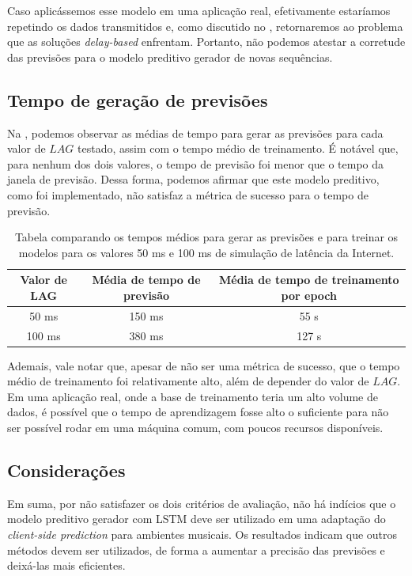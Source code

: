 Caso aplicássemos esse modelo em uma aplicação real, efetivamente estaríamos repetindo os dados transmitidos e, como discutido no , retornaremos ao problema que as soluções \textit{delay-based} enfrentam. Portanto, não podemos atestar a corretude das previsões para o modelo preditivo gerador de novas sequências.

\subsection{Tempo de geração de previsões}

Na , podemos observar as médias de tempo para gerar as previsões para cada valor de $LAG$ testado, assim com o tempo médio de treinamento. É notável que, para nenhum dos dois valores, o tempo de previsão foi menor que o tempo da janela de previsão. Dessa forma, podemos afirmar que este modelo preditivo, como foi implementado, não satisfaz a métrica de sucesso para o tempo de previsão.

\begin{table}[ht!]
    \centering
    \begin{tabular}{|c||c|c|}
        \hline
        
        Valor de LAG & Média de tempo de previsão & Média de tempo de treinamento por epoch \\
        
        \hline
        \hline
        
        50 ms & 150 ms & 55 s  \\ 
        \hline
        
        100 ms & 380 ms & 127 s \\ 
        \hline
    \end{tabular}
    \caption{Tabela comparando os tempos médios para gerar as previsões e para treinar os modelos para os valores 50 ms e 100 ms de simulação de latência da Internet.}
    \label{tab:lstm-time-results}
\end{table}

Ademais, vale notar que, apesar de não ser uma métrica de sucesso, que o tempo médio de treinamento foi relativamente alto, além de depender do valor de $LAG$. Em uma aplicação real, onde a base de treinamento teria um alto volume de dados, é possível que o tempo de aprendizagem fosse alto o suficiente para não ser possível rodar em uma máquina comum, com poucos recursos disponíveis.

\subsection{Considerações}

Em suma, por não satisfazer os dois critérios de avaliação, não há indícios que o modelo preditivo gerador com LSTM deve ser utilizado em uma adaptação do \textit{client-side prediction} para ambientes musicais. Os resultados indicam que outros métodos devem ser utilizados, de forma a aumentar a precisão das previsões e deixá-las mais eficientes.